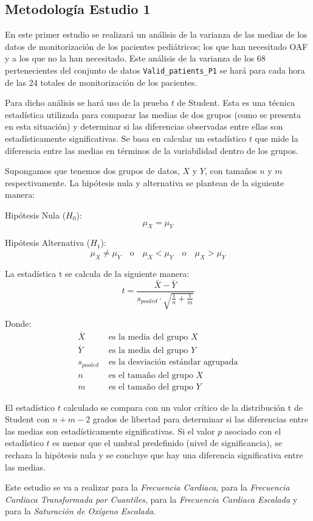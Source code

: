 \subsection{Metodología Estudio 1}\label{sec:metodologia-estudio-1}

En este primer estudio se realizará un análisis de la varianza de las medias de los datos de monitorización de los pacientes pediátricos; los que han necesitado OAF y a los que no la han necesitado. Este análisis de la varianza de los $68$ pertenecientes del conjunto de datos \texttt{Valid\_patients\_P1} se hará para cada hora de las $24$ totales de monitorización de los pacientes.

Para dicho análisis se hará uso de la prueba $t$ de Student. Esta es una técnica estadística utilizada para comparar las medias de dos grupos (como se presenta en esta situación) y determinar si las diferencias observadas entre ellas son estadísticamente significativas. Se basa en calcular un estadístico $t$ que mide la diferencia entre las medias en términos de la variabilidad dentro de los grupos.

Supongamos que tenemos dos grupos de datos, $X$ y $Y$, con tamaños $n$ y $m$ respectivamente. La hipótesis nula y alternativa se plantean de la siguiente manera:

Hipótesis Nula ($H_0$):
\[
\mu_X = \mu_Y
\]

Hipótesis Alternativa ($H_1$):
\[
\mu_X \neq \mu_Y \quad \text{o} \quad \mu_X < \mu_Y \quad \text{o} \quad \mu_X > \mu_Y
\]

La estadística t se calcula de la siguiente manera:
\[
t = \frac{\bar{X} - \bar{Y}}{s_{pooled} \cdot \sqrt{\frac{1}{n} + \frac{1}{m}}}
\]

Donde:
\begin{align*}
\bar{X} & \text{ es la media del grupo } X \\
\bar{Y} & \text{ es la media del grupo } Y \\
s_{pooled} & \text{ es la desviación estándar agrupada} \\
n & \text{ es el tamaño del grupo } X \\
m & \text{ es el tamaño del grupo } Y
\end{align*}

El estadístico $t$ calculado se compara con un valor crítico de la distribución t de Student con $n+m-2$ grados de libertad para determinar si las diferencias entre las medias son estadísticamente significativas. Si el valor $p$ asociado con el estadístico $t$ es menor que el umbral predefinido (nivel de significancia), se rechaza la hipótesis nula y se concluye que hay una diferencia significativa entre las medias.

Este estudio se va a realizar para la \textit{Frecuencia Cardiaca}, para la \textit{Frecuencia Cardiaca Transformada por Cuantiles}, para la \textit{Frecuencia Cardiaca Escalada} y para la \textit{Saturación de Oxígeno Escalada}. 



